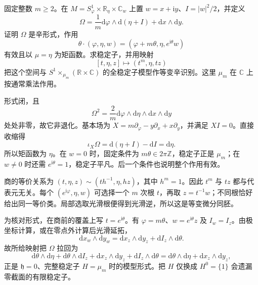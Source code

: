 \begin{exercise}\label{g4:ex:12:finite-stabilizer-model}
	固定整数 \(m\geq2\)。在 \(M=S^1_\varphi\times\mathbb R_\eta\times\mathbb C_w\) 上置 \(w=x+\mathrm iy\)、\(I=|w|^2/2\)，并定义
	\[
		\Omega=\frac1m\mathrm d\varphi\wedge\mathrm d(\eta+I)
		+\mathrm dx\wedge\mathrm dy.
	\]
	证明 \(\Omega\) 是辛形式，作用
	\[
		\theta\cdot(\varphi,\eta,w)
		=(\varphi+m\theta,\eta,e^{\mathrm i\theta}w)
	\]
	有效且以 \(\mu=\eta\) 为矩函数。求稳定子，并用映射
	\[
		[t,\eta,z]\longmapsto(t^m,\eta,tz)
	\]
	把这个空间与 \(S^1\times_{\mu_m}(\mathbb R\times\mathbb C)\) 的全稳定子模型作等变辛识别。这里 \(\mu_m\) 在 \(\mathbb C\) 上按通常乘法作用。
\end{exercise}
\begin{solution}
	形式闭，且
	\[
		\Omega^2=\frac2m\mathrm d\varphi\wedge\mathrm d\eta
		\wedge\mathrm dx\wedge\mathrm dy
	\]
	处处非零，故它非退化。基本场为 \(X=m\partial_\varphi-y\partial_x+x\partial_y\)，并满足 \(XI=0\)。直接收缩得
	\[
		\iota_X\Omega=\mathrm d(\eta+I)-\mathrm dI=\mathrm d\eta.
	\]
	所以矩函数为 \(\eta\)。在 \(w=0\) 时，固定条件为 \(m\theta\in2\pi\mathbb Z\)，稳定子正是 \(\mu_m\)；在 \(w\neq0\) 时还需 \(e^{\mathrm i\theta}=1\)，稳定子平凡。后一个条件也说明整个作用有效。

	商的等价关系为 \((t,\eta,z)\sim(th^{-1},\eta,hz)\)，其中 \(h^m=1\)。因此 \(t^m\) 与 \(tz\) 都与代表元无关。每个 \((e^{\mathrm i\varphi},\eta,w)\) 可选择一个 \(m\) 次根 \(t\)，再取 \(z=t^{-1}w\)；不同根恰好给出同一等价类。局部选取光滑根便得到光滑逆，所以这是等变微分同胚。

	为核对形式，在商前的覆盖上写 \(t=e^{\mathrm i\theta}\)。有 \(\varphi=m\theta\)、\(w=e^{\mathrm i\theta}z\) 及 \(I_w=I_z\)。由极坐标计算，或在零点外计算后光滑延拓，
	\[
		\mathrm dx_w\wedge\mathrm dy_w
		=\mathrm dx_z\wedge\mathrm dy_z
		+\mathrm dI_z\wedge\mathrm d\theta.
	\]
	故所给映射把 \(\Omega\) 拉回为
	\[
		\mathrm d\theta\wedge\mathrm d\eta
		+\mathrm d\theta\wedge\mathrm dI_z
		+\mathrm dx_z\wedge\mathrm dy_z
		+\mathrm dI_z\wedge\mathrm d\theta
		=\mathrm d\theta\wedge\mathrm d\eta
		+\mathrm dx_z\wedge\mathrm dy_z,
	\]
	正是 \(\mathfrak h=0\)、完整稳定子 \(H=\mu_m\) 时的模型形式。把 \(H\) 仅换成 \(H^0=\{1\}\) 会遗漏零截面的有限稳定子。
\end{solution}

